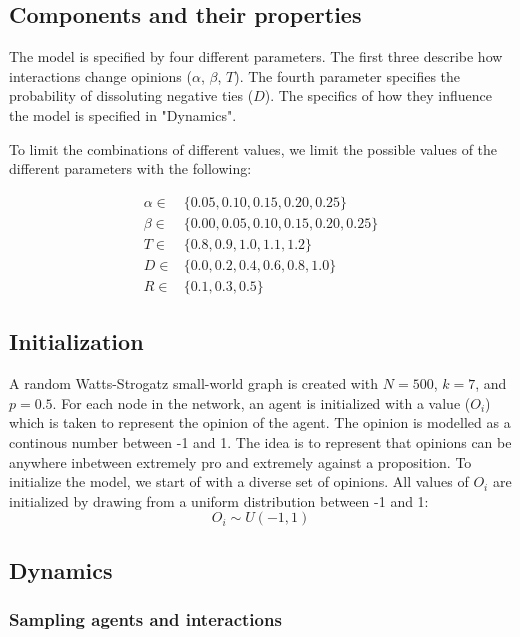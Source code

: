 \documentclass{article}
\begin{document}
\subsection{Components and their properties}
The model is specified by four different parameters. 
The first three describe how interactions change opinions ($\alpha$, $\beta$, $T$). 
The fourth parameter specifies the probability of dissoluting negative ties ($D$).
The specifics of how they influence the model is specified in "Dynamics".  

To limit the combinations of different values, we limit the possible values of the different parameters with the following:


\begin{align*}
    \alpha \in & \{0.05, 0.10, 0.15, 0.20, 0.25\} \\
    \beta \in & \{0.00, 0.05, 0.10, 0.15, 0.20, 0.25\}\\
    T \in & \{0.8, 0.9, 1.0, 1.1, 1.2\}\\
    D \in & \{0.0, 0.2, 0.4, 0.6, 0.8, 1.0\}\\
    R \in & \{0.1, 0.3, 0.5\}
\end{align*}


\subsection{Initialization}
A random Watts-Strogatz small-world graph is created 
with $N=500$, $k=7$, and $p=0.5$. For each node in the network,
an agent is initialized with a value ($O_i$) which is taken to represent the opinion of the agent. The opinion is modelled as a continous number between -1 and 1. 
The idea is to represent that opinions can be anywhere inbetween extremely pro and extremely against a proposition.
To initialize the model, we start of with a diverse set of opinions. All values of $O_i$ are initialized by drawing from a uniform distribution between -1 and 1: 
$$O_i \sim U(-1, 1)$$

\subsection{Dynamics}

\subsubsection{Sampling agents and interactions}
\end{document}
